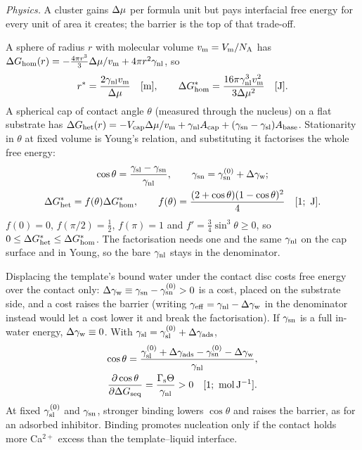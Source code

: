 \textit{Physics.} A cluster gains $\Delta\mu$ per formula unit but pays interfacial free energy for every
unit of area it creates; the barrier is the top of that trade-off.

A sphere of radius $r$ with molecular volume $v_\mathrm{m}=V_\mathrm{m}/N_\mathrm{A}$ has
$\Delta G_\mathrm{hom}(r)=-\tfrac{4\pi r^{3}}{3}\Delta\mu/v_\mathrm{m}+4\pi r^{2}\gamma_\mathrm{nl}$, so
\begin{equation}\label{thsi:eq:hom}
r^{*}=\frac{2\gamma_\mathrm{nl}v_\mathrm{m}}{\Delta\mu} \quad[\mathrm{m}],\qquad \Delta G^{*}_\mathrm{hom}=\frac{16\pi\gamma_\mathrm{nl}^{3}v_\mathrm{m}^{2}}{3\Delta\mu^{2}} \quad[\mathrm{J}].
\end{equation}
A spherical cap of contact angle $\theta$ (measured through the nucleus) on a flat substrate has
$\Delta G_\mathrm{het}(r)=-V_\mathrm{cap}\Delta\mu/v_\mathrm{m}+\gamma_\mathrm{nl} A_\mathrm{cap}+(\gamma_\mathrm{sn}-\gamma_\mathrm{sl})A_\mathrm{base}$.
Stationarity in $\theta$ at fixed volume is Young's relation, and substituting it factorises the whole
free energy:
\begin{equation}\label{thsi:eq:young}
\begin{gathered}
\cos\theta=\frac{\gamma_\mathrm{sl}-\gamma_\mathrm{sn}}{\gamma_\mathrm{nl}},\qquad \gamma_\mathrm{sn}=\gamma_\mathrm{sn}^{(0)}+\Delta\gamma_\mathrm{w};\\
\Delta G^{*}_\mathrm{het}=f(\theta)\Delta G^{*}_\mathrm{hom},\qquad f(\theta)=\frac{(2+\cos\theta)(1-\cos\theta)^{2}}{4} \quad[\mathrm{1;\ J}].
\end{gathered}
\end{equation}
$f(0)=0$, $f(\pi/2)=\tfrac12$, $f(\pi)=1$ and $f'=\tfrac34\sin^{3}\theta\ge0$, so $0\le\Delta G^{*}_\mathrm{het}\le\Delta G^{*}_\mathrm{hom}$.
The factorisation needs one and the same $\gamma_\mathrm{nl}$ on the cap surface and in Young, so the bare $\gamma_\mathrm{nl}$
stays in the denominator.

Displacing the template's bound water under the contact disc costs free energy over the contact only:
$\Delta\gamma_\mathrm{w}\equiv\gamma_\mathrm{sn}-\gamma_\mathrm{sn}^{(0)}>0$ is a cost, placed on the substrate side, and a cost raises the barrier
(writing $\gamma_\mathrm{eff}=\gamma_\mathrm{nl}-\Delta\gamma_\mathrm{w}$ in the denominator instead would let a cost lower it and break the
factorisation). If $\gamma_\mathrm{sn}$ is a full in-water energy, $\Delta\gamma_\mathrm{w}\equiv0$. With $\gamma_\mathrm{sl}=\gamma_\mathrm{sl}^{(0)}+\Delta\gamma_\mathrm{ads}$,
\begin{equation}\label{thsi:eq:young-ads}
\begin{gathered}
\cos\theta=\frac{\gamma_\mathrm{sl}^{(0)}+\Delta\gamma_\mathrm{ads}-\gamma_\mathrm{sn}^{(0)}-\Delta\gamma_\mathrm{w}}{\gamma_\mathrm{nl}},\\
\frac{\partial\cos\theta}{\partial\Delta G_\mathrm{seq}}=\frac{\Gamma_\mathrm{s}\Theta}{\gamma_\mathrm{nl}}>0 \quad[\mathrm{1;\ mol\,J^{-1}}].
\end{gathered}
\end{equation}
At fixed $\gamma_\mathrm{sl}^{(0)}$ and $\gamma_\mathrm{sn}$, stronger binding lowers $\cos\theta$ and raises the barrier, as for an
adsorbed inhibitor. Binding promotes nucleation only if the contact holds more Ca$^{2+}$ excess than the
template--liquid interface.


